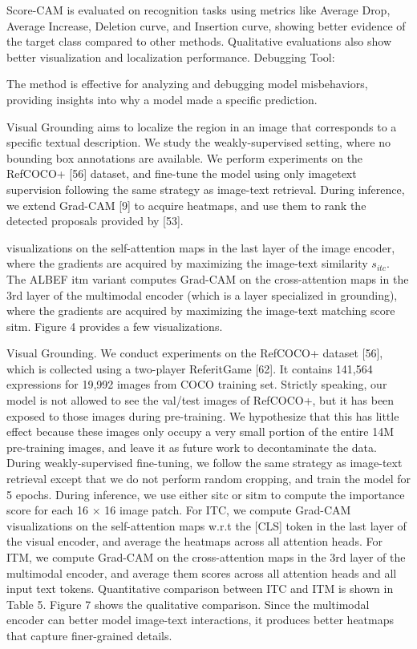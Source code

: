 Score-CAM is evaluated on recognition tasks using metrics like Average Drop, Average Increase, Deletion curve, and Insertion curve, showing better evidence of the target class compared to other methods.
Qualitative evaluations also show better visualization and localization performance.
Debugging Tool:

The method is effective for analyzing and debugging model misbehaviors, providing insights into why a model made a specific prediction.



Visual Grounding aims to localize the region in an image that corresponds to a specific textual description. We study the weakly-supervised setting, where no bounding box annotations are available. We perform experiments on the RefCOCO+ [56] dataset, and fine-tune the model using only imagetext supervision following the same strategy as image-text retrieval. During inference, we extend Grad-CAM [9] to acquire heatmaps, and use them to rank the detected proposals provided by [53].

visualizations on the self-attention maps in the last layer of the image encoder, where the gradients are acquired by maximizing the image-text similarity $s_{itc}$. The ALBEF itm variant computes Grad-CAM on the cross-attention maps in the 3rd layer of the multimodal encoder (which is a layer specialized in grounding), where the gradients are acquired by maximizing the image-text matching score sitm. Figure 4 provides a few visualizations.


Visual Grounding. We conduct experiments on the RefCOCO+ dataset [56], which is collected using a two-player ReferitGame [62]. It contains 141,564 expressions for 19,992 images from COCO training set. Strictly speaking, our model is not allowed to see the val/test images of RefCOCO+, but it has been exposed to those images during pre-training. We hypothesize that this has little effect because these images only occupy a very small portion of the entire 14M pre-training images, and leave it as future work to decontaminate the data. During weakly-supervised fine-tuning, we follow the same strategy as image-text retrieval except that we do not perform random cropping, and train the model for 5 epochs. During inference, we use either sitc or sitm to compute the importance score for each 16 × 16 image patch. For ITC, we compute Grad-CAM visualizations on the self-attention maps w.r.t the [CLS] token in the last layer of the visual encoder, and average the heatmaps across all attention heads. For ITM, we compute Grad-CAM on the cross-attention maps in the 3rd layer of the multimodal encoder, and average them scores across all attention heads and all input text tokens. Quantitative comparison between ITC and ITM is shown in Table 5. Figure 7 shows the qualitative comparison. Since the multimodal encoder can better model image-text interactions, it produces better heatmaps that capture finer-grained details.


